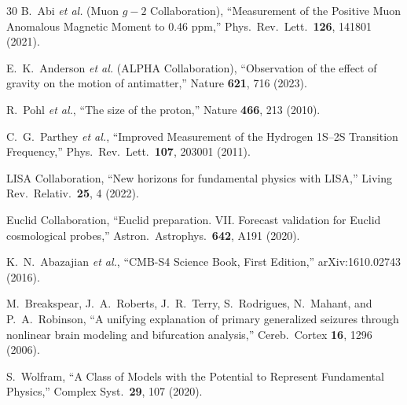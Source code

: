 \documentclass[aps,prd,twocolumn,superscriptaddress,longbibliography,nofootinbib]{revtex4-2}
\begin{document}
\begin{thebibliography}{30}
B.~Abi \textit{et al.} (Muon $g-2$ Collaboration),
``Measurement of the Positive Muon Anomalous Magnetic Moment to
0.46 ppm,''
Phys.\ Rev.\ Lett.\ \textbf{126}, 141801 (2021).

E.~K.~Anderson \textit{et al.} (ALPHA Collaboration),
``Observation of the effect of gravity on the motion of antimatter,''
Nature \textbf{621}, 716 (2023).

R.~Pohl \textit{et al.},
``The size of the proton,''
Nature \textbf{466}, 213 (2010).

C.~G.~Parthey \textit{et al.},
``Improved Measurement of the Hydrogen 1S--2S Transition Frequency,''
Phys.\ Rev.\ Lett.\ \textbf{107}, 203001 (2011).

LISA Collaboration,
``New horizons for fundamental physics with LISA,''
Living Rev.\ Relativ.\ \textbf{25}, 4 (2022).

Euclid Collaboration,
``Euclid preparation. VII. Forecast validation for Euclid
cosmological probes,''
Astron.\ Astrophys.\ \textbf{642}, A191 (2020).

K.~N.~Abazajian \textit{et al.},
``CMB-S4 Science Book, First Edition,''
arXiv:1610.02743 (2016).

M.~Breakspear, J.~A.~Roberts, J.~R.~Terry, S.~Rodrigues,
N.~Mahant, and P.~A.~Robinson,
``A unifying explanation of primary generalized seizures through
nonlinear brain modeling and bifurcation analysis,''
Cereb.\ Cortex \textbf{16}, 1296 (2006).

S.~Wolfram,
``A Class of Models with the Potential to Represent Fundamental
Physics,''
Complex Syst.\ \textbf{29}, 107 (2020).

\end{thebibliography}
\end{document}
